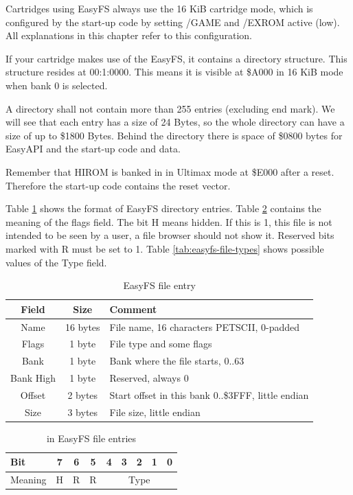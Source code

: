 \documentclass[a4paper,oneside]{memoir}
\begin{document}
Cartridges using EasyFS always use the 16 KiB cartridge mode, which is
configured by the start-up code by setting /GAME and /EXROM active (low). All
explanations in this chapter refer to this configuration.

If your cartridge makes use of the EasyFS, it contains a directory structure.
This structure resides at 00:1:0000. This means it is visible at \$A000 in 16
KiB mode when bank 0 is selected.

A directory shall not contain more than 255 entries (excluding end mark). We
will see that each entry has a size of 24 Bytes, so the whole directory can
have a size of up to \$1800 Bytes. Behind the directory there is space of
\$0800 bytes for EasyAPI and the start-up code and data.

Remember that HIROM is banked in in Ultimax mode at \$E000 after a reset.
Therefore the start-up code contains the reset vector.

Table \ref{tab:easyfs-file-entry} shows the format of EasyFS directory entries.
Table \ref{tab:easyfs-flags} contains the meaning of the flags field. The bit H
means hidden. If this is 1, this file is not intended to be seen by a user, a
file browser should not show it. Reserved bits marked with R must be set to 1.
Table \ref{tab:easyfs-file-types} shows possible values of the Type field.

\begin{table}[!htbp]
    \centering
    \begin{tabularx}{\textwidth}{ ccX }
        \toprule
        Field & Size & Comment \\
        \midrule
        Name        & 16 bytes & File name, 16 characters PETSCII, 0-padded \\[3pt]
        Flags       & 1 byte   & File type and some flags \\[3pt]
        Bank        & 1 byte   & Bank where the file starts, 0..63 \\[3pt]
        Bank High   & 1 byte   & Reserved, always 0 \\[3pt]
        Offset      & 2 bytes  & Start offset in this bank 0..\$3FFF, little endian \\[3pt]
        Size        & 3 bytes  & File size, little endian \\[3pt]
        \bottomrule
    \end{tabularx}
    \caption{EasyFS file entry}
    \label{tab:easyfs-file-entry}
\end{table}

\begin{table}[!htbp]
    \centering
    \begin{tabularx}{0.6\textwidth}{X|c|c|c|c|c|c|c|c}
        \toprule
        Bit     & 7 & 6 & 5 & 4 & 3 & 2 & 1 & 0 \\
        \midrule
        Meaning & H & R & R & \multicolumn{5}{c}{Type} \\
        \bottomrule
    \end{tabularx}
    \caption{ in EasyFS file entries}
    \label{tab:easyfs-flags}
\end{table}
\end{document}
